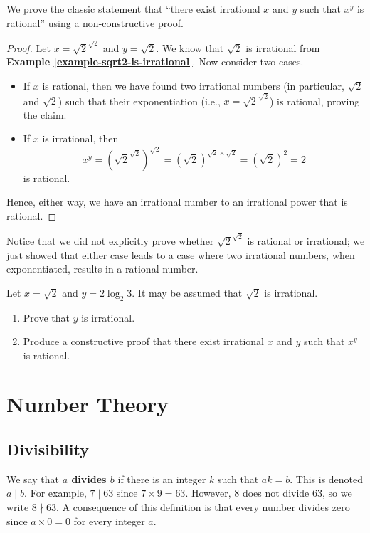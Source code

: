 \begin{example}
    We prove the classic statement that ``there exist irrational $x$ and $y$ such that $x^y$ is rational'' using a non-constructive proof.
    \begin{proof}
        Let $x = \sqrt2^{\sqrt2}$ and $y = \sqrt2$. We know that $\sqrt2$ is irrational from \textbf{Example \ref{example-sqrt2-is-irrational}}. Now consider two cases.
        \begin{itemize}
            \item If $x$ is rational, then we have found two irrational numbers (in particular, $\sqrt 2$ and $\sqrt 2$) such that their exponentiation (i.e.,  $x = \sqrt2^{\sqrt2}$) is rational, proving the claim.
            \item If $x$ is irrational, then \[x^y = \left(\sqrt2^{\sqrt2}\right)^{\sqrt2} = (\sqrt2)^{\sqrt2 \times \sqrt2} = (\sqrt2)^2 = 2\]
            is rational.
        \end{itemize}
        Hence, either way, we have an irrational number to an irrational power that is rational.
    \end{proof}
    Notice that we did not explicitly prove whether $\sqrt2^{\sqrt2}$ is rational or irrational; we just showed that either case leads to a case where two irrational numbers, when exponentiated, results in a rational number.
\end{example}

\begin{exercise}
    Let $x = \sqrt2$ and $y = 2\log_2{3}$. It may be assumed that $\sqrt2$ is irrational.
    \begin{enumerate}[label=(\roman*)]
        \item Prove that $y$ is irrational.
        \item Produce a constructive proof that there exist irrational $x$ and $y$ such that $x^y$ is rational.
    \end{enumerate}
\end{exercise}

\chapter{Number Theory}
\section{Divisibility}
We say that \textbf{$a$ divides $b$} if there is an integer $k$ such that $ak = b$. This is denoted $a\;|\;b$. For example, $7\;|\;63$ since $7 \times 9 = 63$. However, 8 does not divide 63, so we write $8 \nmid 63$. A consequence of this definition is that every number divides zero since $a \times 0 = 0$ for every integer $a$.

